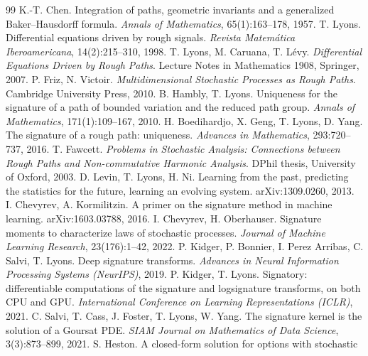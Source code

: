 \documentclass[11pt]{article}
\begin{document}
\begin{thebibliography}{99}
 K.-T. Chen. Integration of paths, geometric invariants and a
  generalized Baker--Hausdorff formula. \emph{Annals of Mathematics},
  65(1):163--178, 1957.
 T. Lyons. Differential equations driven by rough signals.
  \emph{Revista Matem\'atica Iberoamericana}, 14(2):215--310, 1998.
 T. Lyons, M. Caruana, T. L\'evy. \emph{Differential
  Equations Driven by Rough Paths}. Lecture Notes in Mathematics 1908, Springer,
  2007.
 P. Friz, N. Victoir. \emph{Multidimensional Stochastic
  Processes as Rough Paths}. Cambridge University Press, 2010.
 B. Hambly, T. Lyons. Uniqueness for the signature of a
  path of bounded variation and the reduced path group. \emph{Annals of
  Mathematics}, 171(1):109--167, 2010.
 H. Boedihardjo, X. Geng, T. Lyons, D. Yang.
  The signature of a rough path: uniqueness. \emph{Advances in Mathematics},
  293:720--737, 2016.
 T. Fawcett. \emph{Problems in Stochastic Analysis:
  Connections between Rough Paths and Non-commutative Harmonic Analysis}. DPhil
  thesis, University of Oxford, 2003.
 D. Levin, T. Lyons, H. Ni. Learning from the past,
  predicting the statistics for the future, learning an evolving system.
  arXiv:1309.0260, 2013.
 I. Chevyrev, A. Kormilitzin. A primer on the
  signature method in machine learning. arXiv:1603.03788, 2016.
 I. Chevyrev, H. Oberhauser. Signature moments to
  characterize laws of stochastic processes. \emph{Journal of Machine Learning
  Research}, 23(176):1--42, 2022.
 P. Kidger, P. Bonnier, I. Perez Arribas, C. Salvi,
  T. Lyons. Deep signature transforms. \emph{Advances in Neural Information
  Processing Systems (NeurIPS)}, 2019.
 P. Kidger, T. Lyons. Signatory: differentiable
  computations of the signature and logsignature transforms, on both CPU and GPU.
  \emph{International Conference on Learning Representations (ICLR)}, 2021.
 C. Salvi, T. Cass, J. Foster, T. Lyons, W. Yang. The signature
  kernel is the solution of a Goursat PDE. \emph{SIAM Journal on Mathematics of
  Data Science}, 3(3):873--899, 2021.
 S. Heston. A closed-form solution for options with stochastic

\end{thebibliography}
\end{document}
